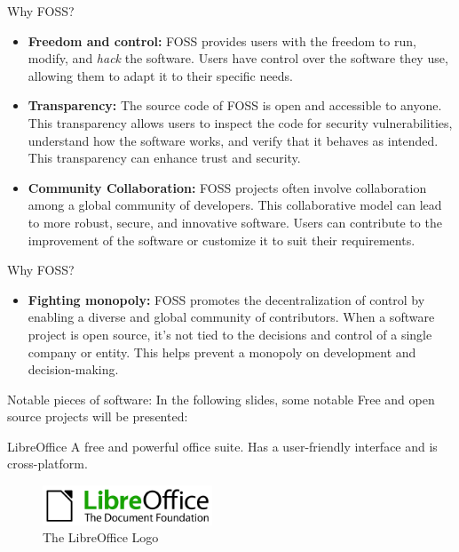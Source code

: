 \documentclass{beamer}
\begin{document}
\begin{frame}{Why FOSS?}
	\begin{itemize}
		\item \textbf{Freedom and control:}  FOSS provides users with the freedom to run, modify, and \textit{hack} the software.
			Users have control over the software they use, allowing them to adapt it to their specific needs.
		\item \textbf{Transparency:} The source code of FOSS is open and accessible to anyone. This transparency allows
			users to inspect the code for security vulnerabilities, understand how the software works,
			and verify that it behaves as intended. This transparency can enhance trust and security.
		\item \textbf{Community Collaboration:} FOSS projects often involve collaboration among a global community of developers.
			This collaborative model can lead to more robust, secure, and innovative software. Users can contribute 
			to the improvement of the software or customize it to suit their requirements.
	\end{itemize}
\end{frame}

\begin{frame}{Why FOSS?}
	\begin{itemize}
		\item \textbf{Fighting monopoly:} FOSS promotes the decentralization of control by enabling a diverse and 
			global community of contributors. When a software project is open source, it's not tied 
			to the decisions and control of a single company or entity. This helps prevent a monopoly 
			on development and decision-making. 
	\end{itemize}
\end{frame}

\begin{frame}{Notable pieces of software:}
	In the following slides, some notable Free and open source projects will be presented:
\end{frame}

\begin{frame}{LibreOffice}
	A free and powerful office suite. Has a user-friendly interface and is cross-platform.
	\begin{figure}[]
		\begin{center}
			\includegraphics[width=0.45\textwidth]{images/LibreOffice.png}
		\end{center}
		\caption{The LibreOffice Logo}
	\end{figure}
\end{frame}
\end{document}
